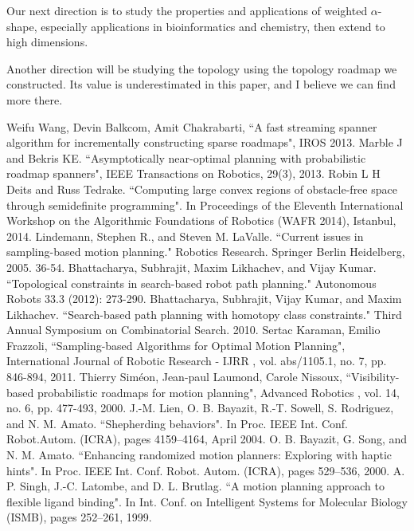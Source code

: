 \documentclass[11pt]{article}
\begin{document}
\indent Our next direction is to study the properties and applications of weighted $\alpha$-shape, especially applications in bioinformatics and chemistry, then extend to high dimensions.

\indent Another direction will be studying the topology using the topology roadmap we constructed. Its value is underestimated in this paper, and I believe we can find more there.


\begin{thebibliography}{1}
   Weifu Wang, Devin Balkcom, Amit Chakrabarti, ``A fast streaming spanner algorithm for incrementally constructing sparse roadmaps", IROS 2013.
   Marble J and Bekris KE. ``Asymptotically near-optimal planning with probabilistic roadmap spanners", IEEE Transactions on Robotics, 29(3), 2013.
   Robin L H Deits and Russ Tedrake. ``Computing large convex regions of obstacle-free space through semidefinite programming". In Proceedings of the Eleventh International Workshop on the Algorithmic Foundations of Robotics (WAFR 2014), Istanbul, 2014.
   Lindemann, Stephen R., and Steven M. LaValle. ``Current issues in sampling-based motion planning." Robotics Research. Springer Berlin Heidelberg, 2005. 36-54.
   Bhattacharya, Subhrajit, Maxim Likhachev, and Vijay Kumar. ``Topological constraints in search-based robot path planning." Autonomous Robots 33.3 (2012): 273-290.
   Bhattacharya, Subhrajit, Vijay Kumar, and Maxim Likhachev. ``Search-based path planning with homotopy class constraints." Third Annual Symposium on Combinatorial Search. 2010.
   Sertac Karaman, Emilio Frazzoli, ``Sampling-based Algorithms for Optimal Motion Planning", International Journal of Robotic Research - IJRR , vol. abs/1105.1, no. 7, pp. 846-894, 2011.
   Thierry Siméon, Jean-paul Laumond, Carole Nissoux, ``Visibility-based probabilistic roadmaps for motion planning", Advanced Robotics , vol. 14, no. 6, pp. 477-493, 2000.
   J.-M. Lien, O. B. Bayazit, R.-T. Sowell, S. Rodriguez, and N. M. Amato. ``Shepherding behaviors". In Proc. IEEE Int. Conf. Robot.Autom. (ICRA), pages 4159–4164, April 2004.
   O. B. Bayazit, G. Song, and N. M. Amato. ``Enhancing randomized motion planners: Exploring with haptic hints". In Proc. IEEE Int. Conf. Robot. Autom. (ICRA), pages 529–536, 2000.
   A. P. Singh, J.-C. Latombe, and D. L. Brutlag. ``A motion planning approach to flexible ligand binding". In Int. Conf. on Intelligent Systems for Molecular Biology (ISMB), pages 252–261, 1999.

\end{thebibliography}
\end{document}
